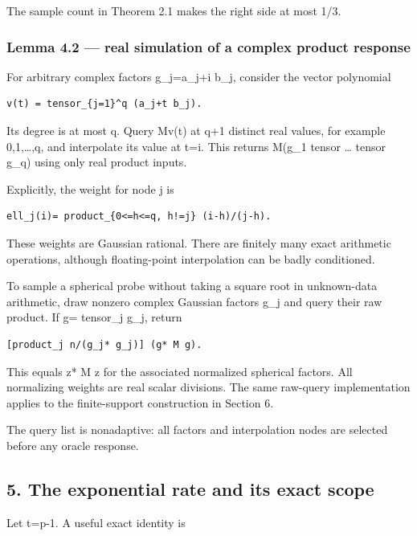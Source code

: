 \documentclass[
  10pt,
]{article}
\begin{document}
The sample count in Theorem 2.1 makes the right side at most 1/3.

\subsubsection{Lemma 4.2 --- real simulation of a complex product
response}\label{lemma-4.2-real-simulation-of-a-complex-product-response}

For arbitrary complex factors g\_j=a\_j+i b\_j, consider the vector
polynomial

\begin{verbatim}
v(t) = tensor_{j=1}^q (a_j+t b_j).
\end{verbatim}

Its degree is at most q. Query Mv(t) at q+1 distinct real values, for
example 0,1,\ldots,q, and interpolate its value at t=i. This returns
M(g\_1 tensor \ldots{} tensor g\_q) using only real product inputs.

Explicitly, the weight for node j is

\begin{verbatim}
ell_j(i)= product_{0<=h<=q, h!=j} (i-h)/(j-h).
\end{verbatim}

These weights are Gaussian rational. There are finitely many exact
arithmetic operations, although floating-point interpolation can be
badly conditioned.

To sample a spherical probe without taking a square root in unknown-data
arithmetic, draw nonzero complex Gaussian factors g\_j and query their
raw product. If g= tensor\_j g\_j, return

\begin{verbatim}
[product_j n/(g_j* g_j)] (g* M g).
\end{verbatim}

This equals z* M z for the associated normalized spherical factors. All
normalizing weights are real scalar divisions. The same raw-query
implementation applies to the finite-support construction in Section 6.

The query list is nonadaptive: all factors and interpolation nodes are
selected before any oracle response.

\subsection{5. The exponential rate and its exact
scope}\label{the-exponential-rate-and-its-exact-scope}

Let t=p-1. A useful exact identity is
\end{document}
